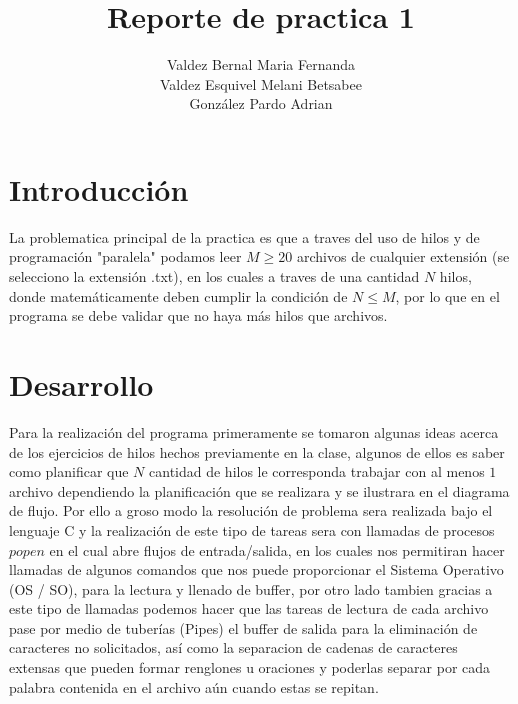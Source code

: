 \documentclass[11pt,a4paper]{article}
\author{Valdez Bernal Maria Fernanda\\Valdez Esquivel Melani Betsabee\\
González Pardo Adrian}
\title{Reporte de practica 1}
\begin{document}
\maketitle
\section{Introducción}
La problematica principal de la practica es que a traves del uso de hilos y de programación "paralela" podamos leer $M \geq 20$ archivos de cualquier extensión (se selecciono la extensión .txt), en los cuales a traves de una cantidad $N$ hilos, donde matemáticamente deben cumplir la condición de $N \leq M$, por lo que en el programa se debe validar que no haya más hilos que archivos.
\section{Desarrollo}
Para la realización del programa primeramente se tomaron algunas ideas acerca de los ejercicios de hilos hechos previamente en la clase, algunos de ellos es saber como planificar que $N$ cantidad de hilos le corresponda trabajar con al menos $1$ archivo dependiendo la planificación que se realizara y se ilustrara en el diagrama de flujo. Por ello a groso modo la resolución de problema sera realizada bajo el lenguaje C y la realización de este tipo de tareas sera con llamadas de procesos $popen$ en el cual abre flujos de entrada/salida, en los cuales nos permitiran hacer llamadas de algunos comandos que nos puede proporcionar el Sistema Operativo (OS / SO), para la lectura y llenado de buffer, por otro lado tambien gracias a este tipo de llamadas podemos hacer que las tareas de lectura de cada archivo pase por medio de tuberías (Pipes) el buffer de salida para la eliminación de caracteres no solicitados, así como la separacion de cadenas de caracteres extensas que pueden formar renglones u oraciones y poderlas separar por cada palabra contenida en el archivo aún cuando estas se repitan.
\end{document}
